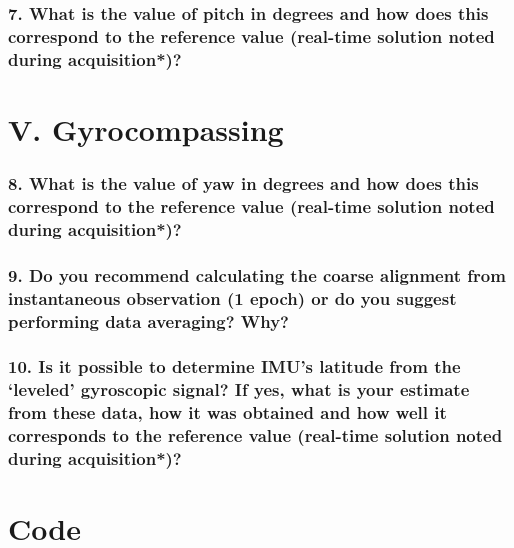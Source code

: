 \documentclass{article}
\begin{document}
\subsubsection*{7. What is the value of pitch in degrees and how does this correspond to the
reference value (real-time solution noted during acquisition*)?}


\section*{V. Gyrocompassing}


\subsubsection*{8. What is the value of yaw in degrees and how does this correspond to the
reference value (real-time solution noted during acquisition*)?}
\subsubsection*{9. Do you recommend calculating the coarse alignment from instantaneous
observation (1 epoch) or do you suggest performing data averaging? Why?}
\subsubsection*{10. Is it possible to determine IMU’s latitude from the ‘leveled’ gyroscopic signal?
If yes, what is your estimate from these data, how it was obtained and how well
it corresponds to the reference value (real-time solution noted during
acquisition*)?}

\newpage
\section*{Code}

\end{document}
